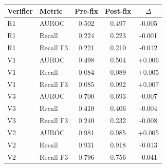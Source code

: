 \begin{tabular}{@{}llccc@{}}
\toprule
Verifier & Metric & Pre-fix & Post-fix & $\Delta$ \\
\midrule
R1 & AUROC & 0.502 & 0.497 & -0.005 \\
R1 & Recall & 0.224 & 0.223 & -0.001 \\
R1 & Recall F3 & 0.221 & 0.210 & -0.012 \\
V1 & AUROC & 0.498 & 0.504 & +0.006 \\
V1 & Recall & 0.084 & 0.089 & +0.005 \\
V1 & Recall F3 & 0.085 & 0.092 & +0.007 \\
V3 & AUROC & 0.700 & 0.693 & -0.007 \\
V3 & Recall & 0.410 & 0.406 & -0.004 \\
V3 & Recall F3 & 0.240 & 0.232 & -0.008 \\
V2 & AUROC & 0.981 & 0.985 & +0.005 \\
V2 & Recall & 0.931 & 0.918 & -0.013 \\
V2 & Recall F3 & 0.796 & 0.756 & -0.041 \\
\bottomrule
\end{tabular}